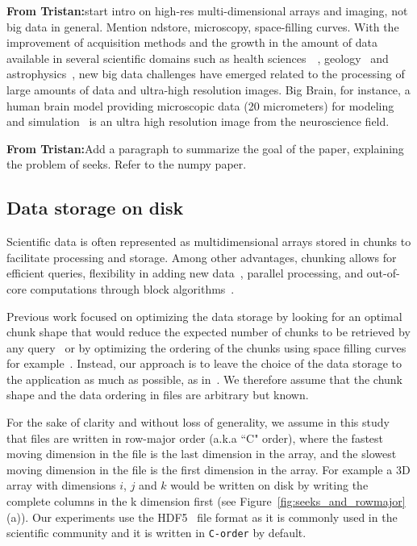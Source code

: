 \documentclass[sigconf, nonacm]{acmart}
\newcommand{\tristan}[1]{\color{orange}\textbf{From Tristan:}#1\color{black}}
\begin{document}
\tristan{start intro on high-res multi-dimensional arrays and imaging, not big data in general. Mention ndstore, microscopy, space-filling curves.}
With the improvement of acquisition methods and the growth in the amount of data
available in several scientific domains such as health
sciences~\cite{bigdata_health}~\cite{Amunts1472}, geology~\cite{big_data_geology}
and astrophysics~\cite{biguniverse}, new big data challenges have emerged related
to the processing of large amounts of data and ultra-high resolution
images. Big Brain, for instance, a human brain model providing microscopic data (20 micrometers) for
modeling and simulation~\cite{Amunts1472} is an ultra high resolution
image from the neuroscience field.

\tristan{Add a paragraph to summarize the goal of the paper, explaining the problem of seeks. Refer to the numpy paper.}

\subsection{Data storage on disk}
Scientific data is often represented as multidimensional arrays stored in
chunks to facilitate processing and storage. Among other advantages, chunking
allows for efficient queries, flexibility in adding new
data~\cite{optimal_chuking}, parallel processing, and out-of-core
computations through block algorithms~\cite{matthew_rocklin-proc-scipy-2015}.

Previous work focused on optimizing the data storage by looking for an optimal
chunk shape that would reduce the expected number of chunks to be retrieved by
any query~\cite{optimal_chuking} or by optimizing the ordering of the chunks
using space filling curves for example~\cite{optimal_chuking, openconnectomecluster}.
Instead, our approach is to leave the choice of the
data storage to the application as much as possible, as in~\cite{seqalgorithms}.
We therefore assume that the chunk shape and the data ordering in files are
arbitrary but known.

For the sake of clarity and without loss of generality,
 we assume in this study that files are written in row-major order (a.k.a
``C" order), where the fastest moving dimension in the file is the last
dimension in the array, and the slowest moving dimension in the file is the first
dimension in the array. For example a 3D array with dimensions $i$, $j$ and $k$
would be written on disk by writing the complete columns in the k dimension first
(see Figure~\ref{fig:seeks_and_rowmajor} (a)).
Our experiments use the HDF5~\cite{hdf5} file format as it is commonly used in the
scientific community and it is written in \texttt{C-order} by default.
\end{document}
